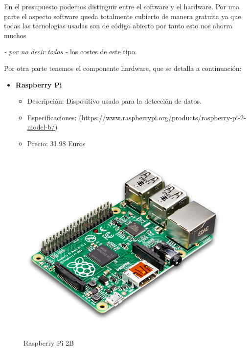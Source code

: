 En el presupuesto podemos distinguir entre el software y el hardware. Por una parte el aspecto software queda totalmente cubierto de manera gratuita ya que todas las tecnologías usadas son de código abierto por tanto esto nos ahorra muchos {\textit{- por no decir todos -} los costes de este tipo.

Por otra parte tenemos el componente hardware, que se detalla a continuación:

\newpage

\begin{itemize}
 \item \textbf{Raspberry Pi}
 \begin{itemize}
  \item Descripción: Dispositivo usado para la detección de datos.
  \item Especificaciones:  (\url{https://www.raspberrypi.org/products/raspberry-pi-2-model-b/})
  \item Precio: 31.98 Euros
 \end{itemize}
\end{itemize}
\begin{figure}[!h]
  \begin{center}
    \includegraphics[scale=0.30]{../images/hardware/pi.png}
    \caption{Raspberry Pi 2B}
    \label{fig:rpi}
  \end{center}
\end{figure}

}
